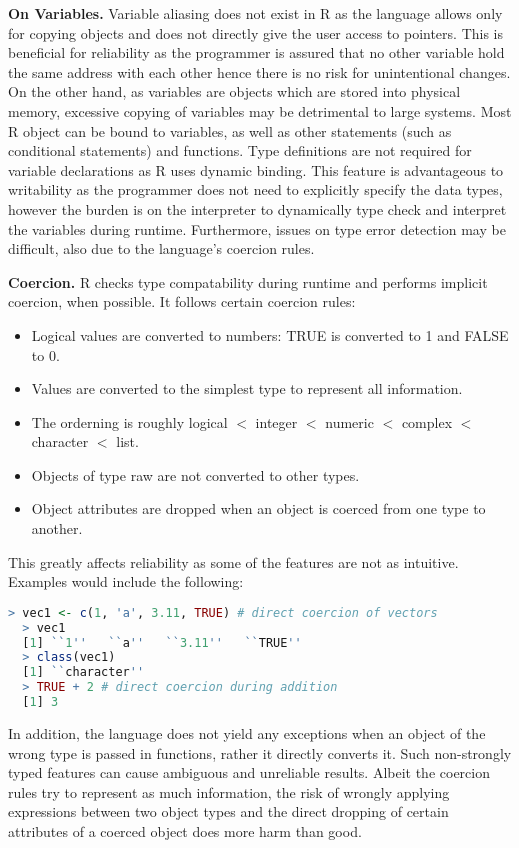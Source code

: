\documentclass[12pt]{article}
\begin{document}
\textbf{On Variables.} Variable aliasing does not exist in R as the language allows only for copying objects and does not directly give the user access to pointers. This is beneficial for reliability as the programmer is assured that no other variable hold the same address with each other hence there is no risk for unintentional changes. On the other hand, as variables are objects which are stored into physical memory, excessive copying of variables may be detrimental to large systems. Most R object can be bound to variables, as well as other statements (such as conditional statements) and functions. Type definitions are not required for variable declarations as R uses dynamic binding. This feature is advantageous to writability as the programmer does not need to explicitly specify the data types, however the burden is on the interpreter to dynamically type check and interpret the variables during runtime. Furthermore, issues on type error detection may be difficult, also due to the language's coercion rules.

\textbf{Coercion.} R checks type compatability during runtime and performs implicit coercion, when possible. It follows certain coercion rules:
\begin{itemize}
\item Logical values are converted to numbers: TRUE is converted to 1 and FALSE to 0.
\item Values are converted to the simplest type to represent all information.
\item The orderning is roughly logical \(<\) integer \(<\) numeric \(<\) complex \(<\) character \(<\) list.
\item Objects of type raw are not converted to other types.
\item Object attributes are dropped when an object is coerced from one type to another.
\end{itemize}

This greatly affects reliability as some of the features are not as intuitive. Examples would include the following:

\begin{lstlisting}[language=R ]
  > vec1 <- c(1, 'a', 3.11, TRUE) # direct coercion of vectors
  > vec1
  [1] ``1''   ``a''   ``3.11''   ``TRUE''
  > class(vec1)
  [1] ``character''
  > TRUE + 2 # direct coercion during addition
  [1] 3
\end{lstlisting}

In addition, the language does not yield any exceptions when an object of the wrong type is passed in functions, rather it directly converts it. Such non-strongly typed features can cause ambiguous and unreliable results. Albeit the coercion rules try to represent as much information, the risk of wrongly applying expressions between two object types and the direct dropping of certain attributes of a coerced object does more harm than good.
\end{document}
